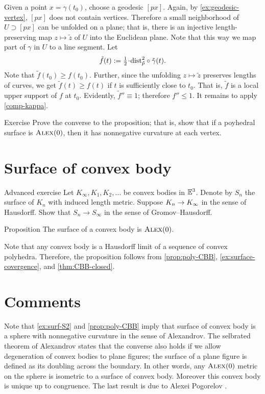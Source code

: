Given a point $x=\gamma(t_0)$, choose a geodesic $[px]$.
Again, by \ref{ex:geodesic-vertex}, $[px]$ does not contain vertices.
Therefore a small neighborhood of $U\supset [px]$ can be unfolded on a plane;
that is, there is an injective length-preserving map $z\mapsto \tilde z$
of $U$ into the Euclidean plane.
Note that this way we map part of $\gamma$ in $U$ to a line segment.
Let 
\[\tilde f(t)\df\tfrac12\cdot\distfun_{\tilde p}^2\circ\tilde \gamma(t).\]
Note that $\tilde f(t_0)\ge f(t_0)$.
Further, since the unfolding $z\mapsto \tilde z$ preserves lengths of curves, we get 
$\tilde f(t)\ge f(t)$ if $t$ is sufficiently close to $t_0$.
That is, $\tilde f$ is a local upper support of $f$ at $t_0$.
Evidently, $\tilde f''\equiv 1$; therefore $f''\le 1$.
It remains to apply \ref{comp-kappa}.
\qeds

\begin{thm}{Exercise}\label{ex:poly-CBB}
Prove the converse to the proposition;
that is, show that if a poyhedral surface is $\textsc{Alex}(0)$, then it has nonnegative curvature at each vertex.
\end{thm}

\section{Surface of convex body}

\begin{thm}{Advanced exercise}\label{ex:surface-covergence}
Let $K_\infty,K_1,K_2,\dots$ be convex bodies in $\mathbb{E}^3$.
Denote by $S_n$ the surface of $K_n$ with induced length metric.
Suppose $K_n\z\to K_\infty$ in the sense of Hausdorff.
Show that $S_n\to S_\infty$ in the sense of Gromov--Hausdorff.
\end{thm}

\begin{thm}{Proposition}\label{prop:conv-surf-CBB(0)}
The surface of a convex body is $\textsc{Alex}(0)$.
\end{thm}

Note that any convex body is a Hausdorff limit of a sequence of convex polyhedra.
Therefore, the proposition follows from \ref{prop:poly-CBB}, \ref{ex:surface-covergence}, and \ref{thm:CBB-closed}.

\section{Comments}

Note that \ref{ex:surf-S2} and \ref{prop:poly-CBB} imply that surface of convex body is a sphere with nonnegative curvature in the sense of Alexandrov.
The selbrated theorem of Alexandrov states that the converse also holds if we allow degeneration of convex bodies to plane figures;
the surface of a plane figure is defined as its doubling across the boundary.
In other words, any $\textsc{Alex}(0)$ metric on the sphere is isometric to a surface of convex body.
Moreover this convex body is unique up to congruence.
The last result is due to Alexei Pogorelov \cite{pogorelov}.

